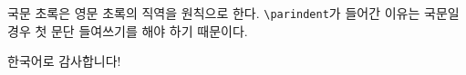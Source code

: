\documentclass[twoside,phd,4x6]{snuthesis}
\theoremstyle{newdef}
\theoremstyle{slthm}
\begin{document}

\clearpage
\begingroup
{} %
	\clearpage{}	
	\printbibliography
\endgroup

%


\cleardoublepage
\begin{abstractalt}
\hspace{\parindent}국문 초록은 영문 초록의 직역을 원칙으로 한다. \texttt{{\textbackslash}parindent}가 들어간 이유는 국문일 경우 첫 문단 들여쓰기를 해야 하기 때문이다.
\end{abstractalt}

\cleardoublepage
\acknowledgement
\hspace{\parindent}한국어로 감사합니다!
\end{document}
